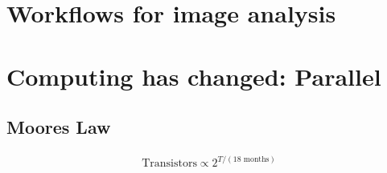 \documentclass[letterpaper,10pt,english]{sphinxmanual}
\begin{document}
\chapter{Workflows for image analysis}
\label{\detokenize{01-Introduction:workflows-for-image-analysis}}

\chapter{Computing has changed: Parallel}
\label{\detokenize{01-Introduction:computing-has-changed-parallel}}

\section{Moores Law}
\label{\detokenize{01-Introduction:moores-law}}\begin{equation*}
\begin{split} \textrm{Transistors} \propto 2^{T/(\textrm{18 months})} \end{split}
\end{equation*}
\end{document}
